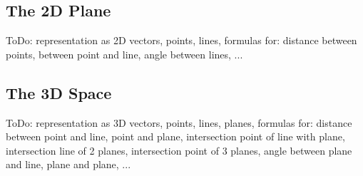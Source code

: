 




\subsection{The 2D Plane}

ToDo: representation as 2D vectors, points, lines, formulas for: distance between points, between point and line, angle between lines, ...



\subsection{The 3D Space}

ToDo: representation as 3D vectors, points, lines, planes, formulas for: distance between point and line, point and plane, intersection point of line with plane, intersection line of 2 planes, intersection point of 3 planes, angle between plane and line, plane and plane, ...


\begin{comment}


Geometrische Interpretation linearer Abbildungen
https://www.youtube.com/watch?v=EQ5Xct2YyLk


Weitz: Analytische Geometrie
https://www.youtube.com/watch?v=7rkkHIjHtNI
https://www.youtube.com/watch?v=7rkkHIjHtNI&list=PLb0zKSynM2PBYzz6l37rWH3B_n_7P40QP

\end{comment}